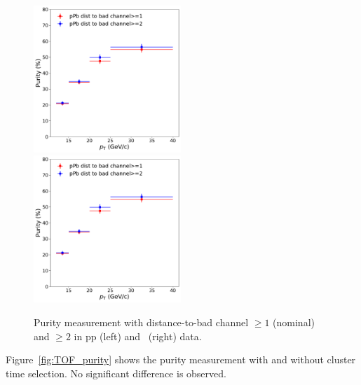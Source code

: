 \begin{figure}
	\center
	\includegraphics[width=0.495\textwidth]{Checks_Systematics/ppbdistance.pdf}
	\includegraphics[width=0.495\textwidth]{Checks_Systematics/ppbdistance.pdf}
	\caption{Purity measurement with distance-to-bad channel $\geq 1$ (nominal) and $\geq 2$ in pp (left) and \pPb~(right) data.}
	\label{fig:distancetobadchannel}
\end{figure}

Figure~\ref{fig:TOF_purity} shows the purity measurement with and without cluster time selection. No significant difference is observed. 

